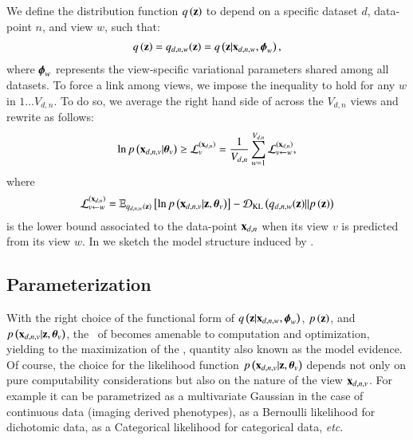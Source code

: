 We define the distribution function $q\left(\mathbf{z}\right)$ to depend on a specific dataset $d$, data-point $n$, and view $w$, such that:
\begin{equation}\label{eq:q}
\begin{aligned}
q\left(\mathbf{z}\right) = q_{d,n,w}(\mathbf{z}) = q\left(\mathbf{z}|\mathbf{x}_{d,n,w}, \boldsymbol{\phi}_w\right),
\end{aligned}
\end{equation}
where $\boldsymbol{\phi}_w$ represents the view-specific variational parameters shared among all datasets.
To force a link among views, we impose the inequality  to hold for any $w$ in $1 \ldots V_{d,n}$.
To do so, we average the right hand side of  across the $V_{d,n}$ views and rewrite  as follows:
\begin{equation}\label{eq:newLB}
\begin{aligned}
\ln p\left(\mathbf{x}_{d,n,v}|\boldsymbol{\theta}_v\right) \geq \mathcal{L}_v^{(\mathbf{x}_{d,n})} = \frac{1}{V_{d,n}} \sum_{w=1}^{V_{d,n}} \mathcal{L}_{v \leftarrow w}^{(\mathbf{x}_{d,n})},
\end{aligned}
\end{equation}
where
\begin{equation}\label{eq:LBdnvw}
\begin{aligned}
\mathcal{L}_{v \leftarrow w}^{(\mathbf{x}_{d,n})} = \operatorname{\mathbb{E}}_{q_{d,n,w}(\mathbf{z})}\left[\ln p\left(\mathbf{x}_{d,n,v}|\mathbf{z}, \boldsymbol{\theta}_v\right)\right] - \operatorname{\mathcal{D}_{KL}}\left(q_{d,n,w}(\mathbf{z})||p\left(\mathbf{z}\right)\right)
\end{aligned}
\end{equation}
is the lower bound associated to the data-point $\mathbf{x}_{d,n}$ when its view $v$ is predicted from its view $w$.
In  we sketch the model structure induced by .



\subsection{Parameterization}
\label{ssec:parameterization}

With the right choice of the functional form of $q\left(\mathbf{z}|\mathbf{x}_{d,n,w}, \boldsymbol{\phi}_w\right)$, $p\left(\mathbf{z}\right)$, and $p\left(\mathbf{x}_{d,n,v}|\mathbf{z}, \boldsymbol{\theta}_v\right)$, the \rhs\ of  becomes amenable to computation and optimization, yielding to the maximization of the \lhs, quantity also known as the model evidence.
Of course, the choice for the likelihood function $p\left(\mathbf{x}_{d,n,v}|\mathbf{z}, \boldsymbol{\theta}_v\right)$ depends not only on pure computability considerations but also on the nature of the view $\mathbf{x}_{d,n,v}$.
For example it can be parametrized as a multivariate Gaussian in the case of continuous data (\ie imaging derived phenotypes), as a Bernoulli likelihood for dichotomic data, as a Categorical likelihood for categorical data, \textit{etc}.

